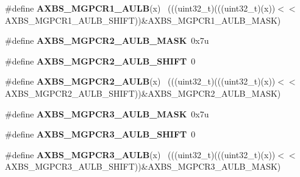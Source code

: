 \begin{DoxyCompactItemize}
\item 
\hypertarget{group___a_x_b_s___register___masks_gaec7d467e7988f6765f7d0c5b9fd9f362}{}\#define {\bfseries A\+X\+B\+S\+\_\+\+M\+G\+P\+C\+R1\+\_\+\+A\+U\+L\+B}(x)                                        ~(((uint32\+\_\+t)(((uint32\+\_\+t)(x))$<$$<$A\+X\+B\+S\+\_\+\+M\+G\+P\+C\+R1\+\_\+\+A\+U\+L\+B\+\_\+\+S\+H\+I\+F\+T))\&A\+X\+B\+S\+\_\+\+M\+G\+P\+C\+R1\+\_\+\+A\+U\+L\+B\+\_\+\+M\+A\+S\+K)\label{group___a_x_b_s___register___masks_gaec7d467e7988f6765f7d0c5b9fd9f362}

\item 
\hypertarget{group___a_x_b_s___register___masks_ga454fa34b9ad3a689e961506a253e3775}{}\#define {\bfseries A\+X\+B\+S\+\_\+\+M\+G\+P\+C\+R2\+\_\+\+A\+U\+L\+B\+\_\+\+M\+A\+S\+K}~0x7u\label{group___a_x_b_s___register___masks_ga454fa34b9ad3a689e961506a253e3775}

\item 
\hypertarget{group___a_x_b_s___register___masks_ga0e4aa4214fd104e88a02473e0bf30c7f}{}\#define {\bfseries A\+X\+B\+S\+\_\+\+M\+G\+P\+C\+R2\+\_\+\+A\+U\+L\+B\+\_\+\+S\+H\+I\+F\+T}~0\label{group___a_x_b_s___register___masks_ga0e4aa4214fd104e88a02473e0bf30c7f}

\item 
\hypertarget{group___a_x_b_s___register___masks_ga917672f09d862ed9ebb0c5419c7f983a}{}\#define {\bfseries A\+X\+B\+S\+\_\+\+M\+G\+P\+C\+R2\+\_\+\+A\+U\+L\+B}(x)                                        ~(((uint32\+\_\+t)(((uint32\+\_\+t)(x))$<$$<$A\+X\+B\+S\+\_\+\+M\+G\+P\+C\+R2\+\_\+\+A\+U\+L\+B\+\_\+\+S\+H\+I\+F\+T))\&A\+X\+B\+S\+\_\+\+M\+G\+P\+C\+R2\+\_\+\+A\+U\+L\+B\+\_\+\+M\+A\+S\+K)\label{group___a_x_b_s___register___masks_ga917672f09d862ed9ebb0c5419c7f983a}

\item 
\hypertarget{group___a_x_b_s___register___masks_ga32728cb5c7a9e5bb1d40e3ae1842fa33}{}\#define {\bfseries A\+X\+B\+S\+\_\+\+M\+G\+P\+C\+R3\+\_\+\+A\+U\+L\+B\+\_\+\+M\+A\+S\+K}~0x7u\label{group___a_x_b_s___register___masks_ga32728cb5c7a9e5bb1d40e3ae1842fa33}

\item 
\hypertarget{group___a_x_b_s___register___masks_gad9320811473f8962f040b6f8bb2b2bf8}{}\#define {\bfseries A\+X\+B\+S\+\_\+\+M\+G\+P\+C\+R3\+\_\+\+A\+U\+L\+B\+\_\+\+S\+H\+I\+F\+T}~0\label{group___a_x_b_s___register___masks_gad9320811473f8962f040b6f8bb2b2bf8}

\item 
\hypertarget{group___a_x_b_s___register___masks_ga6964b690c17128a29a6160a2b1f3b676}{}\#define {\bfseries A\+X\+B\+S\+\_\+\+M\+G\+P\+C\+R3\+\_\+\+A\+U\+L\+B}(x)                                        ~(((uint32\+\_\+t)(((uint32\+\_\+t)(x))$<$$<$A\+X\+B\+S\+\_\+\+M\+G\+P\+C\+R3\+\_\+\+A\+U\+L\+B\+\_\+\+S\+H\+I\+F\+T))\&A\+X\+B\+S\+\_\+\+M\+G\+P\+C\+R3\+\_\+\+A\+U\+L\+B\+\_\+\+M\+A\+S\+K)\label{group___a_x_b_s___register___masks_ga6964b690c17128a29a6160a2b1f3b676}


\end{DoxyCompactItemize}
